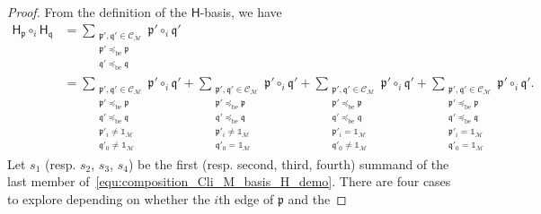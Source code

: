 \documentclass[10pt,reqno]{amsart}
\numberwithin{equation}{subsection}
\newcommand{\Mca}{\mathcal{M}}
\newcommand{\Hsf}{\mathsf{H}}
\newcommand{\Pfr}{\mathfrak{p}}
\newcommand{\Qfr}{\mathfrak{q}}
\newcommand{\Unit}{\mathds{1}}
\newcommand{\Cliques}{\mathcal{C}}
\newcommand{\OrdBE}{\preceq_{\mathrm{be}}}
\begin{document}
\begin{proof}
    From the definition of the $\Hsf$-basis, we have
    \begin{equation}\begin{split}
        \label{equ:composition_Cli_M_basis_H_demo}
        \Hsf_\Pfr \circ_i \Hsf_\Qfr
        & =
        \sum_{\substack{
            \Pfr', \Qfr' \in \Cliques_\Mca \\
            \Pfr' \OrdBE \Pfr \\
            \Qfr' \OrdBE \Qfr
        }}
        \Pfr' \circ_i \Qfr' \\
        & =
        \sum_{\substack{
            \Pfr', \Qfr' \in \Cliques_\Mca \\
            \Pfr' \OrdBE \Pfr \\
            \Qfr' \OrdBE \Qfr \\
            \Pfr'_i \ne \Unit_\Mca \\
            \Qfr'_0 \ne \Unit_\Mca
        }}
        \Pfr' \circ_i \Qfr'
        +
        \sum_{\substack{
            \Pfr', \Qfr' \in \Cliques_\Mca \\
            \Pfr' \OrdBE \Pfr \\
            \Qfr' \OrdBE \Qfr \\
            \Pfr'_i \ne \Unit_\Mca \\
            \Qfr'_0 = \Unit_\Mca
        }}
        \Pfr' \circ_i \Qfr'
        +
        \sum_{\substack{
            \Pfr', \Qfr' \in \Cliques_\Mca \\
            \Pfr' \OrdBE \Pfr \\
            \Qfr' \OrdBE \Qfr \\
            \Pfr'_i = \Unit_\Mca \\
            \Qfr'_0 \ne \Unit_\Mca
        }}
        \Pfr' \circ_i \Qfr'
        +
        \sum_{\substack{
            \Pfr', \Qfr' \in \Cliques_\Mca \\
            \Pfr' \OrdBE \Pfr \\
            \Qfr' \OrdBE \Qfr \\
            \Pfr'_i = \Unit_\Mca \\
            \Qfr'_0 = \Unit_\Mca
        }}
        \Pfr' \circ_i \Qfr'.
    \end{split}\end{equation}
    Let $s_1$ (resp. $s_2$, $s_3$, $s_4$) be the first (resp. second,
    third, fourth) summand of the last member
    of~\eqref{equ:composition_Cli_M_basis_H_demo}. There are four cases
    to explore depending on whether the $i$th edge of $\Pfr$ and the

\end{proof}
\end{document}
